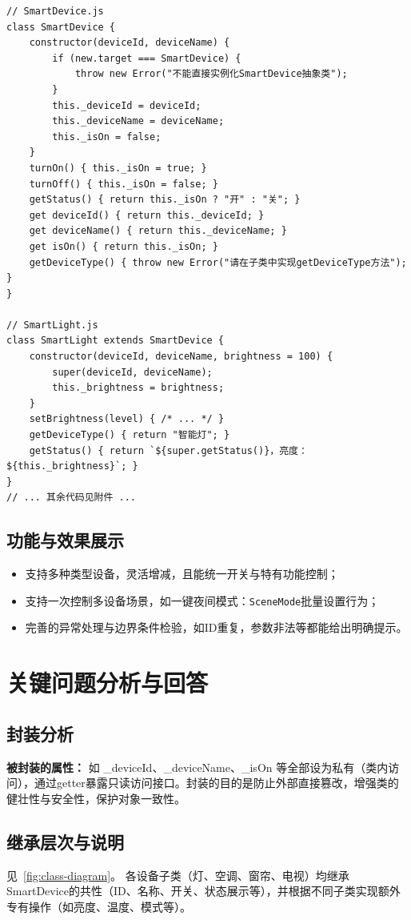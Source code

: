 \documentclass[12pt,hyperref,a4paper,UTF8]{ctexart}
\begin{document}
\begin{verbatim}
// SmartDevice.js
class SmartDevice {
    constructor(deviceId, deviceName) {
        if (new.target === SmartDevice) {
            throw new Error("不能直接实例化SmartDevice抽象类");
        }
        this._deviceId = deviceId;
        this._deviceName = deviceName;
        this._isOn = false;
    }
    turnOn() { this._isOn = true; }
    turnOff() { this._isOn = false; }
    getStatus() { return this._isOn ? "开" : "关"; }
    get deviceId() { return this._deviceId; }
    get deviceName() { return this._deviceName; }
    get isOn() { return this._isOn; }
    getDeviceType() { throw new Error("请在子类中实现getDeviceType方法"); }
}

// SmartLight.js
class SmartLight extends SmartDevice {
    constructor(deviceId, deviceName, brightness = 100) {
        super(deviceId, deviceName);
        this._brightness = brightness;
    }
    setBrightness(level) { /* ... */ }
    getDeviceType() { return "智能灯"; }
    getStatus() { return `${super.getStatus()}，亮度：${this._brightness}`; }
}
// ... 其余代码见附件 ...
\end{verbatim}

\subsection{功能与效果展示}
\begin{itemize}
    \item 支持多种类型设备，灵活增减，且能统一开关与特有功能控制；
    \item 支持一次控制多设备场景，如一键夜间模式：\texttt{SceneMode}批量设置行为；
    \item 完善的异常处理与边界条件检验，如ID重复，参数非法等都能给出明确提示。
\end{itemize}

\section{关键问题分析与回答}
\subsection{封装分析}
\textbf{被封装的属性：} 如 \_deviceId、\_deviceName、\_isOn 等全部设为私有（类内访问），通过getter暴露只读访问接口。封装的目的是防止外部直接篡改，增强类的健壮性与安全性，保护对象一致性。

\subsection{继承层次与说明}
见~\autoref{fig:class-diagram}。
各设备子类（灯、空调、窗帘、电视）均继承SmartDevice的共性（ID、名称、开关、状态展示等），并根据不同子类实现额外专有操作（如亮度、温度、模式等）。
\end{document}
